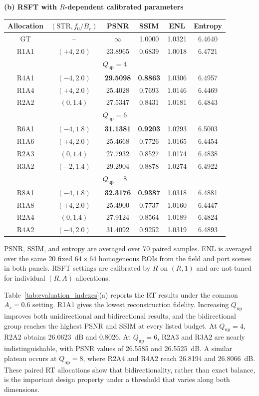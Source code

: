 \documentclass[conference]{IEEEtran}
\begin{document}
\begin{table}[t]
\textbf{(b) RSFT with $R$-dependent calibrated parameters}\\[2pt]
\begin{tabular}{c c c c c c}
\hline
Allocation & $(\mathrm{STR},f_0/B_r)$ & PSNR & SSIM & ENL & Entropy \\
\hline
GT & -- & $\infty$ & 1.0000 & 1.0321 & 6.4640 \\
R1A1 & $(+4,2.0)$ & 23.8965 & 0.6839 & 1.0018 & 6.4721 \\
\hline
\multicolumn{6}{c}{$Q_{\mathrm{up}}=4$} \\
\hline
R4A1 & $(-4,2.0)$ & \textbf{29.5098} & \textbf{0.8863} & 1.0306 & 6.4957 \\
R1A4 & $(+4,2.0)$ & 25.4028 & 0.7693 & 1.0146 & 6.4469 \\
R2A2 & $(0,1.4)$ & 27.5347 & 0.8431 & 1.0181 & 6.4843 \\
\hline
\multicolumn{6}{c}{$Q_{\mathrm{up}}=6$} \\
\hline
R6A1 & $(-4,1.8)$ & \textbf{31.1381} & \textbf{0.9203} & 1.0293 & 6.5003 \\
R1A6 & $(+4,2.0)$ & 25.4668 & 0.7726 & 1.0165 & 6.4454 \\
R2A3 & $(0,1.4)$ & 27.7932 & 0.8527 & 1.0174 & 6.4838 \\
R3A2 & $(-2,1.4)$ & 29.2904 & 0.8878 & 1.0274 & 6.4922 \\
\hline
\multicolumn{6}{c}{$Q_{\mathrm{up}}=8$} \\
\hline
R8A1 & $(-4,1.8)$ & \textbf{32.3176} & \textbf{0.9387} & 1.0318 & 6.4881 \\
R1A8 & $(+4,2.0)$ & 25.4900 & 0.7737 & 1.0160 & 6.4447 \\
R2A4 & $(0,1.4)$ & 27.9124 & 0.8564 & 1.0189 & 6.4824 \\
R4A2 & $(-4,2.0)$ & 31.4092 & 0.9252 & 1.0319 & 6.4893 \\
\hline
\end{tabular}
\vspace{2pt}

\parbox{0.96\textwidth}{\footnotesize PSNR, SSIM, and entropy are averaged over 70 paired samples. ENL is averaged over the same 20 fixed $64\times64$ homogeneous ROIs from the field and port scenes in both panels. RSFT settings are calibrated by $R$ on $(R,1)$ and are not tuned for individual $(R,A)$ allocations.}
\end{table}

Table~\ref{tab:evaluation_indexes}(a) reports the RT results under the common $A_s=0.6$ setting. R1A1 gives the lowest reconstruction fidelity. Increasing $Q_{\mathrm{up}}$ improves both unidirectional and bidirectional results, and the bidirectional group reaches the highest PSNR and SSIM at every listed budget. At $Q_{\mathrm{up}}=4$, R2A2 obtains 26.0623~dB and 0.8026. At $Q_{\mathrm{up}}=6$, R2A3 and R3A2 are nearly indistinguishable, with PSNR values of 26.5585 and 26.5525~dB. A similar plateau occurs at $Q_{\mathrm{up}}=8$, where R2A4 and R4A2 reach 26.8194 and 26.8066~dB. These paired RT allocations show that bidirectionality, rather than exact balance, is the important design property under a threshold that varies along both dimensions.
\end{document}
